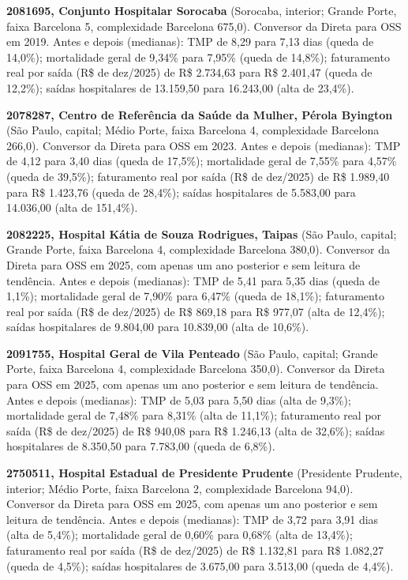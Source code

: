 \newpage
\noindent\textbf{2081695, Conjunto Hospitalar Sorocaba} (Sorocaba, interior; Grande Porte, faixa Barcelona 5, complexidade Barcelona 675,0). Conversor da Direta para OSS em 2019. Antes e depois (medianas): TMP de 8,29 para 7,13 dias (queda de 14,0\%); mortalidade geral de 9,34\% para 7,95\% (queda de 14,8\%); faturamento real por saída (R\$ de dez/2025) de R\$ 2.734,63 para R\$ 2.401,47 (queda de 12,2\%); saídas hospitalares de 13.159,50 para 16.243,00 (alta de 23,4\%).\par\medskip
\noindent\textbf{2078287, Centro de Referência da Saúde da Mulher, Pérola Byington} (São Paulo, capital; Médio Porte, faixa Barcelona 4, complexidade Barcelona 266,0). Conversor da Direta para OSS em 2023. Antes e depois (medianas): TMP de 4,12 para 3,40 dias (queda de 17,5\%); mortalidade geral de 7,55\% para 4,57\% (queda de 39,5\%); faturamento real por saída (R\$ de dez/2025) de R\$ 1.989,40 para R\$ 1.423,76 (queda de 28,4\%); saídas hospitalares de 5.583,00 para 14.036,00 (alta de 151,4\%).\par\medskip
\noindent\textbf{2082225, Hospital Kátia de Souza Rodrigues, Taipas} (São Paulo, capital; Grande Porte, faixa Barcelona 4, complexidade Barcelona 380,0). Conversor da Direta para OSS em 2025, com apenas um ano posterior e sem leitura de tendência. Antes e depois (medianas): TMP de 5,41 para 5,35 dias (queda de 1,1\%); mortalidade geral de 7,90\% para 6,47\% (queda de 18,1\%); faturamento real por saída (R\$ de dez/2025) de R\$ 869,18 para R\$ 977,07 (alta de 12,4\%); saídas hospitalares de 9.804,00 para 10.839,00 (alta de 10,6\%).\par\medskip
\noindent\textbf{2091755, Hospital Geral de Vila Penteado} (São Paulo, capital; Grande Porte, faixa Barcelona 4, complexidade Barcelona 350,0). Conversor da Direta para OSS em 2025, com apenas um ano posterior e sem leitura de tendência. Antes e depois (medianas): TMP de 5,03 para 5,50 dias (alta de 9,3\%); mortalidade geral de 7,48\% para 8,31\% (alta de 11,1\%); faturamento real por saída (R\$ de dez/2025) de R\$ 940,08 para R\$ 1.246,13 (alta de 32,6\%); saídas hospitalares de 8.350,50 para 7.783,00 (queda de 6,8\%).\par\medskip
\noindent\textbf{2750511, Hospital Estadual de Presidente Prudente} (Presidente Prudente, interior; Médio Porte, faixa Barcelona 2, complexidade Barcelona 94,0). Conversor da Direta para OSS em 2025, com apenas um ano posterior e sem leitura de tendência. Antes e depois (medianas): TMP de 3,72 para 3,91 dias (alta de 5,4\%); mortalidade geral de 0,60\% para 0,68\% (alta de 13,4\%); faturamento real por saída (R\$ de dez/2025) de R\$ 1.132,81 para R\$ 1.082,27 (queda de 4,5\%); saídas hospitalares de 3.675,00 para 3.513,00 (queda de 4,4\%).\par\medskip

